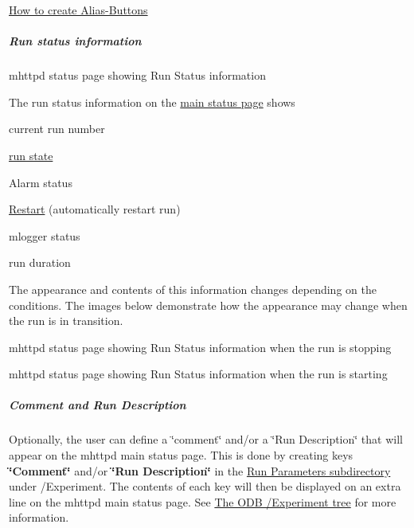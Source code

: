 \begin{DoxyItemize}
\item \hyperlink{RC_mhttpd_Alias_page_RC_mhttpd_alias_define}{How to create Alias-\/Buttons}
\end{DoxyItemize}

\par


\par
\hypertarget{RC_mhttpd_status_page_features_RC_mhttpd_status_Run_info}{}\subparagraph{Run status information}\label{RC_mhttpd_status_page_features_RC_mhttpd_status_Run_info}
\begin{center} mhttpd status page showing Run Status information  \end{center} \par


The run status information on the \hyperlink{RC_mhttpd_Main_Status_page_RC_mhttpd_main_status}{main status page} shows
\begin{DoxyItemize}
\item current run number
\item \hyperlink{RC_mhttpd_status_page_features_RC_table_run_state}{run state}
\item Alarm status
\item \hyperlink{F_Logging_Data_F_Logger_Auto_Restart}{Restart} (automatically restart run)
\item mlogger status
\item run duration
\end{DoxyItemize}

The appearance and contents of this information changes depending on the conditions. The images below demonstrate how the appearance may change when the run is in transition.

\begin{center} mhttpd status page showing Run Status information when the run is stopping  \end{center} \par


\begin{center} mhttpd status page showing Run Status information when the run is starting  \end{center} \par


\par


\par
 \hypertarget{RC_mhttpd_status_page_features_RC_Edit_RP}{}\subparagraph{Comment and Run Description}\label{RC_mhttpd_status_page_features_RC_Edit_RP}
Optionally, the user can define a \char`\"{}comment\char`\"{} and/or a \char`\"{}Run Description\char`\"{} that will appear on the mhttpd main status page. This is done by creating keys {\bfseries \char`\"{}Comment\char`\"{}} and/or {\bfseries \char`\"{}Run Description\char`\"{}} in the \hyperlink{RC_customize_ODB_RC_Run_Parameters}{Run Parameters subdirectory} under /Experiment. The contents of each key will then be displayed on an extra line on the mhttpd main status page. See \hyperlink{RC_customize_ODB_RC_ODB_Experiment_Tree}{The ODB /Experiment tree} for more information.


